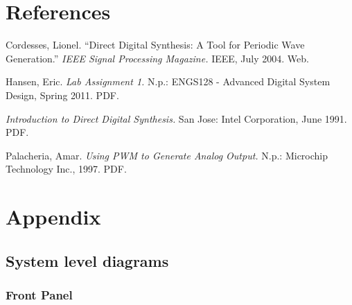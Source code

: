 \documentclass{article}
\begin{document}
\newpage
\section{References}


  \begin{thebibliography}{9}

  	Cordesses, Lionel.
  	``Direct Digital Synthesis: A Tool for Periodic Wave Generation.''
  	\emph{IEEE Signal Processing Magazine.}
  	IEEE,
  	July 2004. 
  	Web.  	

  	Hansen, Eric.
  	\emph{Lab Assignment 1.}
  	N.p.:
  	ENGS128 - Advanced Digital System Design, Spring 2011.
  	PDF.

  	\emph{Introduction to Direct Digital Synthesis.}
  	San Jose: Intel Corporation,
  	June 1991.
  	PDF.

  	Palacheria, Amar.
  	\emph{Using PWM to Generate Analog Output.}
  	N.p.: Microchip Technology Inc.,
  	1997.
  	PDF.

  \end{thebibliography}

\newpage
\section{Appendix}
  \listoffigures

  \newpage
  \subsection{System level diagrams}

    \subsubsection{Front Panel}
      
\end{document}
